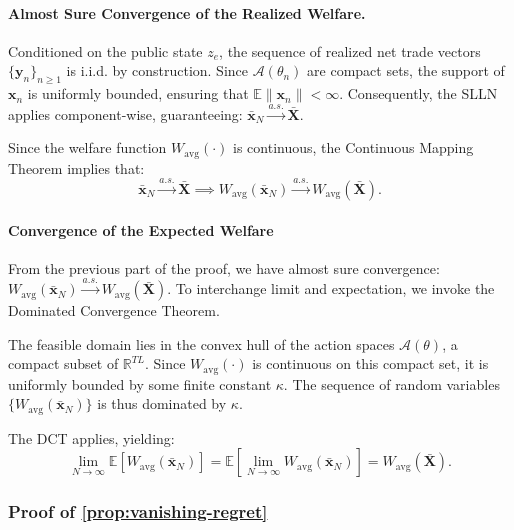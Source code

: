 \documentclass[12pt, notitlepage]{article}
\begin{document}
\paragraph{Almost Sure Convergence of the Realized Welfare.} Conditioned on the public state $z_e$, the sequence of realized net trade vectors $\{\mathbf{y}_n\}_{n \ge 1}$ is i.i.d. by construction. Since $\mathcal A(\theta_n)$ are compact sets, the support of $\mathbf{x}_n$ is uniformly bounded, ensuring that $\mathbb{E}\|\mathbf{x}_n\| < \infty$. Consequently, the SLLN applies component-wise, guaranteeing: $\bar{\mathbf{x}}_N \xrightarrow{a.s.} \bar{\mathbf{X}}$. 

Since the welfare function $W_{\text{avg}}(\cdot)$ is continuous, the Continuous Mapping Theorem implies that:
\begin{equation*}
    \bar{\mathbf{x}}_N \xrightarrow{a.s.} \bar{\mathbf{X}} \implies W_{\text{avg}}(\bar{\mathbf{x}}_N) \xrightarrow{a.s.} W_{\text{avg}}(\bar{\mathbf{X}}). \tag*{\qed}
\end{equation*}

\paragraph*{Convergence of the Expected Welfare}
From the previous part of the proof, we have almost sure convergence: $W_{\text{avg}}(\bar{\mathbf{x}}_N) \xrightarrow{a.s.} W_{\text{avg}}(\bar{\mathbf{X}})$. To interchange limit and expectation, we invoke the Dominated Convergence Theorem. 

The feasible domain lies in the convex hull of the action spaces $\mathcal{A}(\theta)$, a compact subset of $\mathbb{R}^{TL}$. Since $W_{\text{avg}}(\cdot)$ is continuous on this compact set, it is uniformly bounded by some finite constant $\kappa$. The sequence of random variables $\{W_{\text{avg}}(\bar{\mathbf{x}}_N)\}$ is thus dominated by $\kappa$. 

The DCT applies, yielding:
\begin{equation*}
  \lim_{N \to \infty} \mathbb{E}\left[ W_{\text{avg}}(\bar{\mathbf{x}}_N) \right] = \mathbb{E}\left[ \lim_{N \to \infty} W_{\text{avg}}(\bar{\mathbf{x}}_N) \right] = W_{\text{avg}}(\bar{\mathbf{X}}). \tag*{\qed}  
\end{equation*}


\subsubsection*{Proof of \cref{prop:vanishing-regret}}
\end{document}
